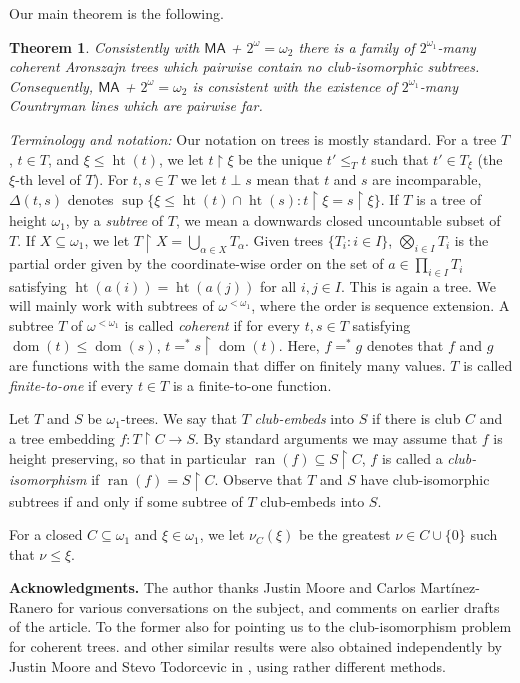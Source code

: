 \documentclass[10pt,a4paper]{amsart}
\newtheorem{maintheorem}{Theorem}
\theoremstyle{definition}
\newcommand{\seb}{\subseteq}
\newcommand{\res}{\!\upharpoonright\!}
\newcommand{\MA}{\textsf{MA}}
\newcommand{\1}{\mathbf{1}}
\DeclareMathOperator{\dom}{dom}
\DeclareMathOperator{\ran}{ran}
\DeclareMathOperator{\hht}{ht}
\begin{document}
Our main theorem is the following.


\begin{maintheorem}\label{thm:main}
  Consistently with $\MA$ + $2^{\omega} = \omega_{2}$ there is a family of
  $2^{\omega_{1}}$-many coherent Aronszajn trees
  which pairwise contain no club-isomorphic subtrees.
  Consequently,
  $\MA$ + $2^{\omega} = \omega_{2}$ is consistent with the existence of
  $2^{\omega_{1}}$-many Countryman lines which are pairwise far.
\end{maintheorem}


\noindent\emph{Terminology and notation:} Our notation on trees is mostly
standard. For a tree $T$, $t \in T$, and $\xi \le \hht(t)$,
we let $t\res \xi$ be the unique $t' \le_{T} t$ such that
$t' \in T_{\xi}$ (the $\xi$-th level of
$T$). For $t,s \in T$ we let $t \perp s$ mean
that $t$ and $s$ are incomparable,
$\Delta(t,s)$ denotes $\sup\{\xi \le \hht(t)\cap\hht(s)
: t\res \xi = s \res \xi\}$.
If $T$ is a tree of height $\omega_{1}$, by a \emph{subtree} of $T$,
we mean a downwards closed uncountable subset of $T$. If $X \seb \omega_{1}$,
we let $T \res X = \bigcup_{\alpha \in X}T_{\alpha}$.
Given
trees $\{T_{i} : i \in I\}$, $\bigotimes_{i \in I}T_{i}$ is the
partial order given by the coordinate-wise order on the set of $a \in
\prod_{i \in I}T_{i}$ satisfying $\hht(a(i)) = \hht(a(j))$ for all $i,j \in I$.
This is again a tree.
We will mainly work with subtrees of
$\omega^{<\omega_{1}}$, where the order is sequence extension. A subtree $T$ of
$\omega^{<\omega_{1}}$ is called \emph{coherent} if for every $t,s \in
T$ satisfying $\dom(t) \le \dom(s)$, $t =^{*} s\res\dom(t)$. Here,
$f =^{*} g$ denotes that $f$ and $g$ are functions with the same domain
that differ on finitely many values. $T$
is called \emph{finite-to-one} if every $t \in T$ is a finite-to-one
function.

Let $T$ and $S$ be $\omega_{1}$-trees. We say that $T$ \emph{club-embeds}
into $S$ if there is club $C$ and a tree embedding $f : T \res C \to S$.
By standard arguments we may assume that $f$ is height preserving,
so that in particular $\ran(f) \seb S \res C$, $f$ is called
a \emph{club-isomorphism} if $\ran(f) = S \res C$. Observe that $T$ and
$S$ have club-isomorphic subtrees if and only if some subtree of $T$
club-embeds into $S$.

For a closed $C \seb \omega_{1}$ and $\xi \in \omega_{1}$,
we let $\nu_{C}(\xi)$ be the greatest
$\nu \in C \cup \{0\}$ such that $\nu \le \xi$.

\bigskip
\noindent \textbf{Acknowledgments.}
The author thanks Justin Moore and Carlos Martínez-Ranero for various
conversations on the subject, and comments on earlier drafts of the
article. To the former also for pointing us to the club-isomorphism
problem for coherent trees.  and other similar results
were also obtained independently by Justin Moore and Stevo Todorcevic
in \cite{MooreTodorcevic}, using rather different methods.
\end{document}
